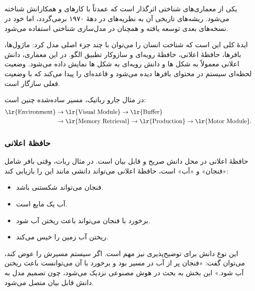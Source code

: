 \subsection{}
 یکی از معماری‌های شناختی اثرگذار است که عمدتاً با کارهای  و همکارانش شناخته می‌شود. ریشه‌های تاریخی آن به نظریه‌های  در دههٔ ۱۹۷۰ برمی‌گردد، اما خود  در نسخه‌های بعدی توسعه یافته و همچنان در مدل‌سازی شناختی استفاده می‌شود.

ایدهٔ کلی  این است که شناخت انسان را می‌توان با چند جزء اصلی مدل کرد: ماژول‌ها، بافرها، حافظهٔ اعلانی، حافظهٔ رویه‌ای و سازوکار تطبیق الگو. در این معماری، دانش اعلانی معمولاً به شکل ها و دانش رویه‌ای به شکل ها نمایش داده می‌شود. وضعیت لحظه‌ای سیستم در محتوای بافرها دیده می‌شود و  قاعده‌ای را پیدا می‌کند که با وضعیت فعلی سازگار است.

در مثال جارو رباتیک، مسیر ساده‌شده چنین است:
\[
\begin{aligned}
\text{\lr{Environment}}
&\rightarrow
\text{\lr{Visual Module}}
\rightarrow
\text{\lr{Buffer}}\\
&\rightarrow
\text{\lr{Memory Retrieval}}
\rightarrow
\text{\lr{Production}}
\rightarrow
\text{\lr{Motor Module}}.
\end{aligned}
\]


\subsubsection{حافظهٔ اعلانی}
حافظهٔ اعلانی در  محل دانش صریح و قابل بیان است. در مثال ربات، وقتی بافر شامل «فنجان» و «آب» است، حافظهٔ اعلانی می‌تواند دانشی مانند این را بازیابی کند:
\begin{itemize}
  \item فنجان می‌تواند شکستنی باشد.
  \item آب یک مایع است.
  \item برخورد با فنجان می‌تواند باعث ریختن آب شود.
  \item ریختن آب زمین را خیس می‌کند.
\end{itemize}

این نوع دانش برای توضیح‌پذیری نیز مهم است. اگر سیستم مسیرش را عوض کند، می‌توان گفت: «فنجان پر از آب در مسیر بود و برخورد با آن می‌توانست باعث ریختن آب شود.» این بخش به بحث  در هوش مصنوعی نزدیک می‌شود، چون تصمیم مدل به دانش قابل بیان متصل می‌شود.

